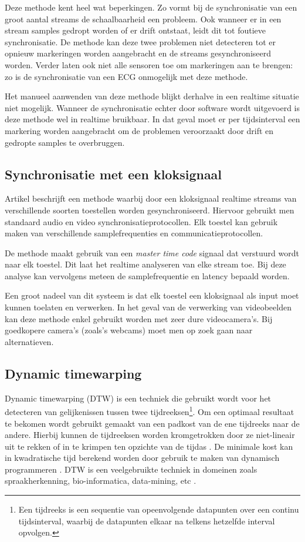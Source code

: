 Deze methode kent heel wat beperkingen. Zo vormt bij de synchronisatie van een groot aantal streams de schaalbaarheid een probleem. Ook wanneer er in een stream samples gedropt worden of er drift ontstaat, leidt dit tot foutieve synchronisatie. De methode kan deze twee problemen niet detecteren tot er opnieuw markeringen worden aangebracht en de streams gesynchroniseerd worden. Verder laten ook niet alle sensoren toe om markeringen aan te brengen: zo is de synchronisatie van een ECG onmogelijk met deze methode.

Het manueel aanwenden van deze methode blijkt derhalve in een realtime situatie niet mogelijk.  Wanneer de synchronisatie echter door software wordt uitgevoerd is deze methode wel in realtime bruikbaar. In dat geval moet er per tijdsinterval een markering worden aangebracht om de problemen veroorzaakt door drift en gedropte samples te overbruggen.

\subsection{Synchronisatie met een kloksignaal}

Artikel \cite{jaimovich2010synchronization} beschrijft een methode waarbij door een kloksignaal realtime streams van verschillende soorten toestellen worden gesynchroniseerd. Hiervoor gebruikt men standaard audio en video synchronisatieprotocollen. Elk toestel kan gebruik maken van verschillende samplefrequenties en communicatieprotocollen.

De methode maakt gebruik van een \textit{master time code} signaal dat verstuurd wordt naar elk toestel. Dit laat het realtime analyseren van elke stream toe. Bij deze analyse kan vervolgens meteen de samplefrequentie en latency bepaald worden. 

Een groot nadeel van dit systeem is dat elk toestel een kloksignaal als input moet kunnen toelaten en verwerken. In het geval van de verwerking van videobeelden kan deze methode enkel gebruikt worden met zeer dure videocamera's. Bij goedkopere camera's (zoals's webcams) moet men op zoek gaan naar alternatieven. \cite{six2015multimodal}



\subsection{Dynamic timewarping}

Dynamic timewarping (DTW) is een techniek die gebruikt wordt voor het detecteren van gelijkenissen tussen twee tijdreeksen\footnote{Een tijdreeks is een sequentie van opeenvolgende datapunten over een continu tijdsinterval, waarbij de datapunten elkaar na telkens hetzelfde interval opvolgen.}. Om een optimaal resultaat te bekomen wordt gebruikt gemaakt van een padkost van de ene tijdreeks naar de andere. Hierbij kunnen de tijdreeksen worden kromgetrokken door ze niet-lineair uit te rekken of in te krimpen ten opzichte van de tijdas \cite{salvador2007toward}. De minimale kost kan in kwadratische tijd berekend worden door gebruik te maken van dynamisch programmeren \cite{dixon2005live}. DTW is een veelgebruikte techniek in domeinen zoals spraakherkenning, bio-informatica, data-mining, etc \cite{ratanamahatana2004everything}.

